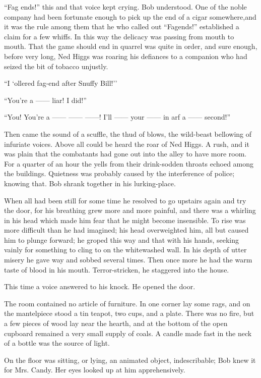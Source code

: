 ``Fag ends!'' this and that voice kept crying. Bob understood. One of
the noble company had been fortunate enough to pick up the end of a
cigar somewhere,and it was the rule among them that he who called out
``Fagends!'' established a claim for a few whiffs. In this way the
delicacy was passing from mouth to mouth. That the game should end
{\protect\hypertarget{198}{}{}}in quarrel was quite in order, and sure
enough, before very long, Ned Higgs was roaring his defiances to a
companion who had seized the bit of tobacco unjustly.

``I `ollered fag-end after Snuffy Bill!''

``You're a {{------}} liar! I did!''

``You! You're a {{------}} {{------}} {{------}}! I'll {{------}} your
{{------}} in arf a {{------}} second!''

Then came the sound of a scuffle, the thud of blows, the wild-beast
bellowing of infuriate voices. Above all could be heard the roar of Ned
Higgs. A rush, and it was plain that the combatants had gone out into
the alley to have more room. For a quarter of an hour the yells from
their drink-sodden throats echoed among the buildings. Quietness was
probably caused by the interference of police; knowing that. Bob shrank
together in his lurking-place.

When all had been still for some time he resolved to go upstairs again
and try the door, for his breathing grew more and more painful, and
there was a whirling in his head which made him fear that he might
become insensible. To rise was more difficult than he had imagined; his
head overweighted him, all but caused him to plunge forward; he groped
this {\protect\hypertarget{199}{}{}}way and that with his hands, seeking
vainly for something to cling to on the whitewashed wall. In his depth
of utter misery he gave way and sobbed several times. Then once more he
had the warm taste of blood in his mouth. Terror-stricken, he staggered
into the house.

This time a voice answered to his knock. He opened the door.

The room contained no article of furniture. In one corner lay some rags,
and on the mantelpiece stood a tin teapot, two cups, and a plate. There
was no fire, but a few pieces of wood lay near the hearth, and at the
bottom of the open cupboard remained a very small supply of coals. A
candle made fast in the neck of a bottle was the source of light.

On the floor was sitting, or lying, an animated object, indescribable;
Bob knew it for Mrs. Candy. Her eyes looked up at him apprehensively.

